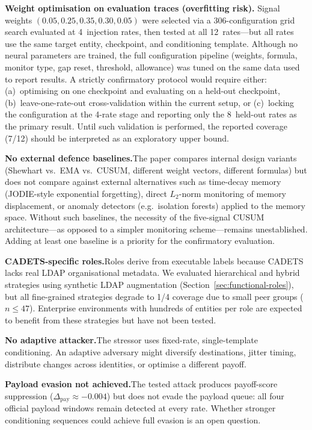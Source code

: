 \documentclass[10pt,twocolumn]{article}
\begin{document}
\textbf{Weight optimisation on evaluation traces (overfitting risk).}\quad
Signal weights $(0.05,0.25,0.35,0.30,0.05)$ were selected via a
306-configuration grid search evaluated at 4~injection rates, then tested
at all 12~rates---but all rates use the same target entity, checkpoint, and
conditioning template.  Although no neural parameters are trained, the
full configuration pipeline (weights, formula, monitor type, gap reset,
threshold, allowance) was tuned on the same data used to report results.
A strictly confirmatory protocol would require either: (a)~optimising
on one checkpoint and evaluating on a held-out checkpoint,
(b)~leave-one-rate-out cross-validation within the current setup, or
(c)~locking the configuration at the 4-rate stage and reporting only the
8~held-out rates as the primary result.  Until such validation is
performed, the reported coverage (7/12) should be interpreted as an
exploratory upper bound.

\textbf{No external defence baselines.}\quad The paper compares internal
design variants (Shewhart vs.\ EMA vs.\ CUSUM, different weight vectors,
different formulas) but does not compare against external alternatives
such as time-decay memory (JODIE-style exponential forgetting), direct
$L_2$-norm monitoring of memory displacement, or anomaly detectors
(e.g.\ isolation forests) applied to the memory space.  Without such
baselines, the necessity of the five-signal CUSUM architecture---as
opposed to a simpler monitoring scheme---remains unestablished.  Adding
at least one baseline is a priority for the confirmatory evaluation.

\textbf{CADETS-specific roles.}\quad Roles derive from executable labels
because CADETS lacks real LDAP organisational metadata.  We evaluated
hierarchical and hybrid strategies using synthetic LDAP augmentation
(Section~\ref{sec:functional-roles}), but all fine-grained strategies
degrade to 1/4 coverage due to small peer groups ($n\le47$).  Enterprise
environments with hundreds of entities per role are expected to benefit
from these strategies but have not been tested.

\textbf{No adaptive attacker.}\quad The stressor uses fixed-rate,
single-template conditioning.  An adaptive adversary might diversify
destinations, jitter timing, distribute changes across identities, or
optimise a different payoff.

\textbf{Payload evasion not achieved.}\quad The tested attack produces
payoff-score suppression ($\Delta_{\mathrm{pay}}\approx-0.004$) but does not
evade the payload queue: all four official payload windows remain detected
at every rate.  Whether stronger conditioning sequences could achieve full
evasion is an open question.
\end{document}

